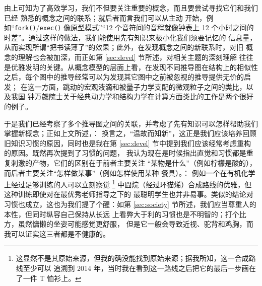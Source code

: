 由上可知为了高效学习，我们不但要关注重要的概念，而且要尝试寻找它们和我们已经
熟悉的概念之间的联系；就后者而言我们可以从主动%
开始，例如“\verb|fork()|/\verb|exec()| 像原型模式”“12 个音符间的音程就像钟表上
12 个小时之间的时差”。通过这样的做法，我们能使用先有知识来极小化我们须要记忆的
信息量，从而实现所谓“把书读薄了”的效果；此外，在发现概念之间的新联系时，对旧
概念的理解也会被加深，而正如第 \ref{sec:devel} 节所述，对相关主题的深刻理解
往往是优雅发明的关键。从概念模型的层面上看，在发现不同推导图在结构上的相似性
之后，每个图中的推导经常可以为发现其它图中之前被忽视的推导提供无价的启发；
在这一方面，跳动的宏观液滴和被量子力学支配的微观粒子之间的类比，以及我国
钟万勰院士关于经典动力学和结构力学在计算方面类比的工作是两个很好的例子。

于是我们已经考察了多个推导图之间的关联，并考虑了先有知识可以怎样帮助我们
掌握新概念；正如上文所述，：
换言之，“温故而知新”，这正是我们应该培养回顾旧知识习惯的原因，同时也是我在第
\ref{sec:devel} 节中提到我们应该经常考虑重构的原因。既然再次提到了习惯的问题，
我认为现在是时候指出直觉和习惯都是重复刺激的产物，它们的区别在于前者主要关注
“某物是什么”（例如柠檬是酸的），而后者主要关注“怎样做某事”（例如怎样使用某种
餐具）。：
例如一个在有机化学上经过足够训练的人可以立刻察觉 \parencite{zxhxy2018}\footnote%
{这显然不是其原始来源，但我的确没能找到原始来源；据我所知，这一合成路线至少可以
追溯到 2014 年，当时我在看到这一路线之后把它的最后一步画在了一件 T 恤衫上。}%
中囧烷（经过环猫烯）合成路线的优雅，但这种训练即使对在最优秀老师指导之下的
最聪明学生也并非易事。类似的结论对习惯也成立，这也为我们提了个醒：如第
\ref{sec:society} 节所述，我们应当尊重人的本性，但同时纵容自己保持从长远
上看弊大于利的习惯也是不明智的；打个比方，虽然慵懒的坐姿可能感觉更舒服，
但是它一般会导致近视、驼背和鸡胸，而我可以证实这三者都是不健康的。

